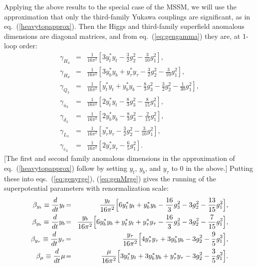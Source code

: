\documentclass[11pt]{article}
\def\beq{\begin{eqnarray}}
\def\eeq{\end{eqnarray}}
\def\sbar{\overline}
\begin{document}
Applying the above results to the special case of the MSSM, we will use the 
approximation that only the third-family Yukawa
couplings are significant, as in eq.~(\ref{heavytopapprox}). Then the
Higgs and third-family superfield anomalous dimensions are diagonal
matrices, and from eq.~(\ref{eq:gengamma}) they are, at 1-loop
order: 
\beq
\gamma_{H_u} \!&=&\! 
\frac{1}{16 \pi^2} \left [
3 y_t^* y_t - \frac{3}{2} g_2^2 - \frac{3}{10} g_1^2
\right ],
\label{eq:gammaHu}
\\
\gamma_{H_d} \!&=&\! \frac{1}{16 \pi^2} \left [
3 y_b^* y_b + y_\tau^* y_\tau - \frac{3}{2} g_2^2 
- \frac{3}{10} g_1^2
\right ],
\\
\gamma_{Q_3} \!&=&\! \frac{1}{16 \pi^2} \left [
y_t^* y_t + y_b^* y_b - \frac{8}{3} g_3^2
- \frac{3}{2} g_2^2 - \frac{1}{30} g_1^2
\right ],
\\
\gamma_{\sbar{u}_3} \!&=&\! \frac{1}{16 \pi^2} \left [
2 y_t^* y_t  -\frac{8}{3} g_3^2 -\frac{8}{15} 
g_1^2
\right ],
\\
\gamma_{\sbar{d}_3} \!&=&\! \frac{1}{16 \pi^2} \left [
2 y_b^* y_b  -\frac{8}{3} g_3^2 -\frac{2}{15} 
g_1^2
\right ],
\\
\gamma_{L_3} \!&=&\! \frac{1}{16 \pi^2} \left [
y_\tau^* y_\tau - \frac{3}{2} g_2^2 - \frac{3}{10} 
g_1^2
\right ],
\\
\gamma_{\sbar{e}_3} \!&=&\! \frac{1}{16 \pi^2} \left [
2 y_\tau^* y_\tau  -\frac{6}{5} g_1^2
\right ].
\label{eq:gammae}
\eeq
[The first and second family anomalous dimensions in the approximation of
eq.~(\ref{heavytopapprox}) follow by setting $y_t$, $y_b$, and $y_\tau$ to
$0$ in the above.] Putting these into eqs.~(\ref{eq:genyrge}),
(\ref{eq:genMrge}) gives the running of the superpotential parameters with
renormalization scale:
\beq
\beta_{y_t} \equiv
{d\over dt} y_t \!&=&\! {y_t \over 16 \pi^2} \Bigl [ 6 y_t^* y_t + y_b^* y_b
- {16\over 3} g_3^2 - 3 g_2^2 - {13\over 15} g_1^2 \Bigr ],
\label{eq:betayt}
\\
\beta_{y_b} \equiv
{d\over dt} y_b \!&=&\! {y_b \over 16 \pi^2} 
\Bigl [ 6 y_b^* y_b + y_t^* y_t + 
y_\tau^* y_\tau - {16\over 3} g_3^2 - 3 g_2^2 - {7\over 15} g_1^2 \Bigr ],
\\
\beta_{y_\tau} \equiv
{d\over dt} y_\tau \!&=&\! {y_\tau \over 16 \pi^2} 
\Bigl [ 4 y_\tau^* y_\tau 
+ 3 y_b^* y_b - 3 g_2^2 - {9\over 5} g_1^2 \Bigr ],
\\
\beta_{\mu} \equiv
{d\over dt} \mu \!&=&\! {\mu \over 16 \pi^2} 
\Bigl [ 3 y_t^* y_t + 3 y_b^* y_b
+ y_\tau^* y_\tau - 3 g_2^2 - {3\over 5} g_1^2 \Bigr ].
\label{eq:betamu}
\eeq
\end{document}
